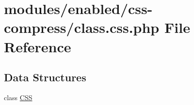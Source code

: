 \hypertarget{class_8css_8php}{\section{modules/enabled/css-\/compress/class.css.\-php File Reference}
\label{class_8css_8php}
}
\subsection*{Data Structures}
\begin{DoxyCompactItemize}
\item 
class \hyperlink{class_c_s_s}{C\-S\-S}
\end{DoxyCompactItemize}
